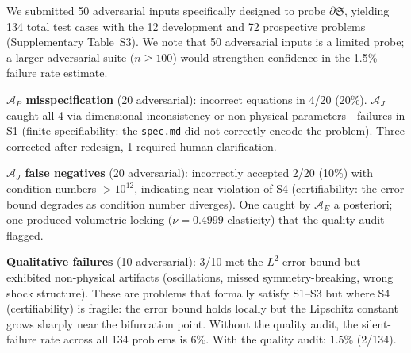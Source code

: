 \documentclass[11pt,a4paper]{article}
\newcommand{\Sclass}{\mathfrak{S}}
\newcommand{\Agent}{\mathcal{A}}
\begin{document}
We submitted 50 adversarial inputs specifically designed to probe $\partial \Sclass$, yielding 134 total test cases with the 12 development and 72 prospective problems (Supplementary Table~S3). We note that 50 adversarial inputs is a limited probe; a larger adversarial suite ($n \geq 100$) would strengthen confidence in the 1.5\% failure rate estimate.

\textbf{$\Agent_P$ misspecification} (20 adversarial): incorrect equations in 4/20 (20\%). $\Agent_J$ caught all 4 via dimensional inconsistency or non-physical parameters---failures in S1 (finite specifiability: the \texttt{spec.md} did not correctly encode the problem). Three corrected after redesign, 1 required human clarification.

\textbf{$\Agent_J$ false negatives} (20 adversarial): incorrectly accepted 2/20 (10\%) with condition numbers $> 10^{12}$, indicating near-violation of S4 (certifiability: the error bound degrades as condition number diverges). One caught by $\Agent_E$ a posteriori; one produced volumetric locking ($\nu = 0.4999$ elasticity) that the quality audit flagged.

\textbf{Qualitative failures} (10 adversarial): 3/10 met the $L^2$ error bound but exhibited non-physical artifacts (oscillations, missed symmetry-breaking, wrong shock structure). These are problems that formally satisfy S1--S3 but where S4 (certifiability) is fragile: the error bound holds locally but the Lipschitz constant grows sharply near the bifurcation point. Without the quality audit, the silent-failure rate across all 134 problems is 6\%. With the quality audit: 1.5\% (2/134).
\end{document}
